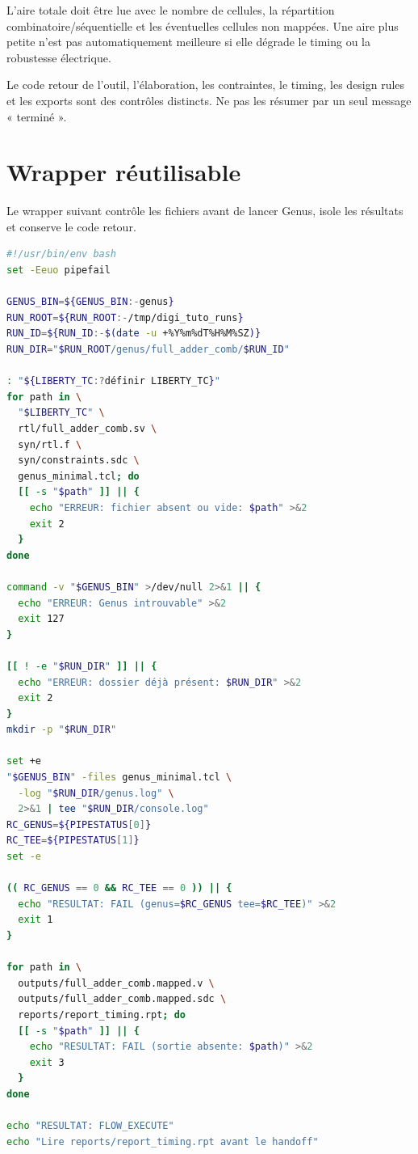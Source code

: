 \documentclass[11pt,a4paper,openany]{report}
\begin{document}
L'aire totale doit être lue avec le nombre de cellules, la répartition
combinatoire/séquentielle et les éventuelles cellules non mappées. Une aire
plus petite n'est pas automatiquement meilleure si elle dégrade le timing ou
la robustesse électrique.

\begin{warningbox}
Le code retour de l'outil, l'élaboration, les contraintes, le timing, les
design rules et les exports sont des contrôles distincts. Ne pas les résumer
par un seul message « terminé ».
\end{warningbox}

\chapter{Wrapper réutilisable}

Le wrapper suivant contrôle les fichiers avant de lancer Genus, isole les
résultats et conserve le code retour.

\begin{lstlisting}[style=guidecode,language=bash,
caption={run\_genus.sh}]
#!/usr/bin/env bash
set -Eeuo pipefail

GENUS_BIN=${GENUS_BIN:-genus}
RUN_ROOT=${RUN_ROOT:-/tmp/digi_tuto_runs}
RUN_ID=${RUN_ID:-$(date -u +%Y%m%dT%H%M%SZ)}
RUN_DIR="$RUN_ROOT/genus/full_adder_comb/$RUN_ID"

: "${LIBERTY_TC:?définir LIBERTY_TC}"
for path in \
  "$LIBERTY_TC" \
  rtl/full_adder_comb.sv \
  syn/rtl.f \
  syn/constraints.sdc \
  genus_minimal.tcl; do
  [[ -s "$path" ]] || {
    echo "ERREUR: fichier absent ou vide: $path" >&2
    exit 2
  }
done

command -v "$GENUS_BIN" >/dev/null 2>&1 || {
  echo "ERREUR: Genus introuvable" >&2
  exit 127
}

[[ ! -e "$RUN_DIR" ]] || {
  echo "ERREUR: dossier déjà présent: $RUN_DIR" >&2
  exit 2
}
mkdir -p "$RUN_DIR"

set +e
"$GENUS_BIN" -files genus_minimal.tcl \
  -log "$RUN_DIR/genus.log" \
  2>&1 | tee "$RUN_DIR/console.log"
RC_GENUS=${PIPESTATUS[0]}
RC_TEE=${PIPESTATUS[1]}
set -e

(( RC_GENUS == 0 && RC_TEE == 0 )) || {
  echo "RESULTAT: FAIL (genus=$RC_GENUS tee=$RC_TEE)" >&2
  exit 1
}

for path in \
  outputs/full_adder_comb.mapped.v \
  outputs/full_adder_comb.mapped.sdc \
  reports/report_timing.rpt; do
  [[ -s "$path" ]] || {
    echo "RESULTAT: FAIL (sortie absente: $path)" >&2
    exit 3
  }
done

echo "RESULTAT: FLOW_EXECUTE"
echo "Lire reports/report_timing.rpt avant le handoff"
\end{lstlisting}
\end{document}
